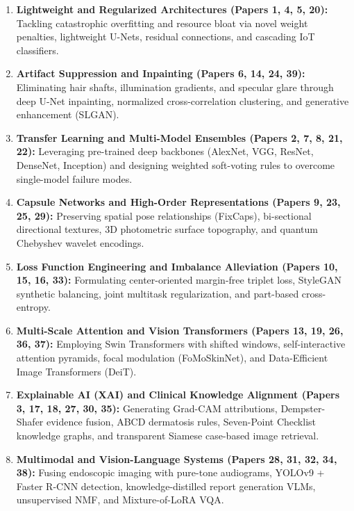 \documentclass[10pt,a4paper]{article}
\begin{document}
\begin{enumerate}[leftmargin=*,itemsep=2pt]
    \item \textbf{Lightweight and Regularized Architectures (Papers 1, 4, 5, 20):} Tackling catastrophic overfitting and resource bloat via novel weight penalties, lightweight U-Nets, residual connections, and cascading IoT classifiers.
    \item \textbf{Artifact Suppression and Inpainting (Papers 6, 14, 24, 39):} Eliminating hair shafts, illumination gradients, and specular glare through deep U-Net inpainting, normalized cross-correlation clustering, and generative enhancement (SLGAN).
    \item \textbf{Transfer Learning and Multi-Model Ensembles (Papers 2, 7, 8, 21, 22):} Leveraging pre-trained deep backbones (AlexNet, VGG, ResNet, DenseNet, Inception) and designing weighted soft-voting rules to overcome single-model failure modes.
    \item \textbf{Capsule Networks and High-Order Representations (Papers 9, 23, 25, 29):} Preserving spatial pose relationships (FixCaps), bi-sectional directional textures, 3D photometric surface topography, and quantum Chebyshev wavelet encodings.
    \item \textbf{Loss Function Engineering and Imbalance Alleviation (Papers 10, 15, 16, 33):} Formulating center-oriented margin-free triplet loss, StyleGAN synthetic balancing, joint multitask regularization, and part-based cross-entropy.
    \item \textbf{Multi-Scale Attention and Vision Transformers (Papers 13, 19, 26, 36, 37):} Employing Swin Transformers with shifted windows, self-interactive attention pyramids, focal modulation (FoMoSkinNet), and Data-Efficient Image Transformers (DeiT).
    \item \textbf{Explainable AI (XAI) and Clinical Knowledge Alignment (Papers 3, 17, 18, 27, 30, 35):} Generating Grad-CAM attributions, Dempster-Shafer evidence fusion, ABCD dermatosis rules, Seven-Point Checklist knowledge graphs, and transparent Siamese case-based image retrieval.
    \item \textbf{Multimodal and Vision-Language Systems (Papers 28, 31, 32, 34, 38):} Fusing endoscopic imaging with pure-tone audiograms, YOLOv9 + Faster R-CNN detection, knowledge-distilled report generation VLMs, unsupervised NMF, and Mixture-of-LoRA VQA.
\end{enumerate}

\newpage
\end{document}
